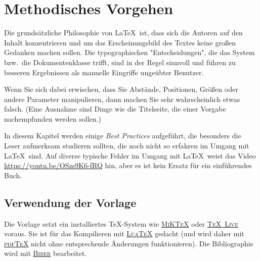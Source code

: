 \chapter{Methodisches Vorgehen}

Die grundsätzliche Philosophie von \LaTeX\ ist, dass sich die Autoren auf den
Inhalt konzentrieren und um das Erscheinungsbild des Textes keine großen
Gedanken machen sollen.  Die typographischen "Entscheidungen", die das System
bzw.\ die Dokumentenklasse trifft, sind in der Regel sinnvoll und führen zu
besseren Ergebnissen als manuelle Eingriffe ungeübter Benutzer.

Wenn Sie sich dabei erwischen, dass Sie Abstände, Positionen, Größen oder
andere Parameter manipulieren, dann machen Sie sehr wahrscheinlich etwas
falsch.  (Eine Ausnahme sind Dinge wie die Titelseite, die einer Vorgabe
nachempfunden werden sollen.)

In diesem Kapitel werden einige \textit{Best Practices} aufgeführt, die
besonders die Leser aufmerksam studieren sollten, die noch nicht so erfahren
im Umgang mit \LaTeX\ sind.  Auf diverse typische Fehler im Umgang mit \LaTeX\
weist das Video \url{https://youtu.be/OSzs9K6-fRQ} hin, aber es ist kein
Ersatz für ein einführendes Buch.

\section{Verwendung der Vorlage}

Die Vorlage setzt ein installiertes \TeX-System wie
\href{https://de.wikipedia.org/wiki/MiKTeX}{\textsc{MiK\TeX}} oder
\href{https://de.wikipedia.org/wiki/TeX_Live}{\textsc{\TeX\ Live}} voraus.
Sie ist für das Kompilieren mit
\href{https://de.wikipedia.org/wiki/LuaTeX}{\textsc{Lua\TeX}} gedacht (und
wird daher mit \href{https://de.wikipedia.org/wiki/PdfTeX}{\textsc{pdf\TeX}}
nicht ohne entsprechende Änderungen funktionieren).  Die Bibliographie wird
mit \href{https://en.wikipedia.org/wiki/Biber_(LaTeX)}{\textsc{Biber}}
bearbeitet.

